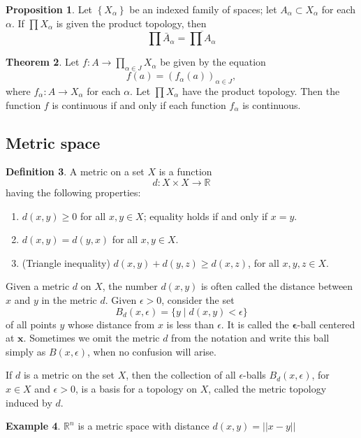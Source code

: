 \documentclass[12pt,a4paper]{book}
\newcommand{\bb}[1]{\mathbb{#1}}
\newenvironment{enu}{\begin{enumerate}[(1)]}{\end{enumerate}}
\theoremstyle{definition}
\newtheorem{defn}{Definition}[section]
\newtheorem{theo}[defn]{Theorem}
\newtheorem{prop}[defn]{Proposition}
\newtheorem{exam}[defn]{Example}
\begin{document}
\begin{prop}
    Let $\left\{X_\alpha\right\}$ be an indexed family of spaces; let $A_\alpha \subset X_\alpha$ for each $\alpha$. If $\prod X_\alpha$ is given the product topology, then
    $$
        \prod \bar{A}_\alpha=\overline{\prod A_\alpha}
    $$
\end{prop}
\begin{theo}
    Let $f: A \rightarrow \prod_{\alpha \in J} X_\alpha$ be given by the equation
    $$
        f(a)=\left(f_\alpha(a)\right)_{\alpha \in J},
    $$
    where $f_\alpha: A \rightarrow X_\alpha$ for each $\alpha$. Let $\prod X_\alpha$ have the product topology. Then the function $f$ is continuous if and only if each function $f_\alpha$ is continuous.
\end{theo}
\subsection{Metric space}
\begin{defn}
    A metric on a set $X$ is a function
    $$
        d: X \times X \longrightarrow \bb{R}
    $$
    having the following properties:
    \begin{enu}
        \item  $d(x, y) \geq 0$ for all $x, y \in X$; equality holds if and only if $x=y$.
        \item  $d(x, y)=d(y, x)$ for all $x, y \in X$.
        \item  (Triangle inequality) $d(x, y)+d(y, z) \geq d(x, z)$, for all $x, y, z \in X$.
    \end{enu}
    Given a metric $d$ on $X$, the number $d(x, y)$ is often called the distance between $x$ and $y$ in the metric $d$. Given $\epsilon>0$, consider the set
    $$
        B_d(x, \epsilon)=\{y \mid d(x, y)<\epsilon\}
    $$
    of all points $y$ whose distance from $x$ is less than $\epsilon$. It is called the $\boldsymbol{\epsilon}$-ball centered at $\boldsymbol{x}$. Sometimes we omit the metric $d$ from the notation and write this ball simply as $B(x, \epsilon)$, when no confusion will arise.

    If $d$ is a metric on the set $X$, then the collection of all $\epsilon$-balls $B_d(x, \epsilon)$, for $x \in X$ and $\epsilon>0$, is a basis for a topology on $X$, called the metric topology induced by $d$.
\end{defn}
\begin{exam}
    $\bb{R}^n$ is a metric space with distance $d(x,y)=||x-y||$
\end{exam}
\end{document}

